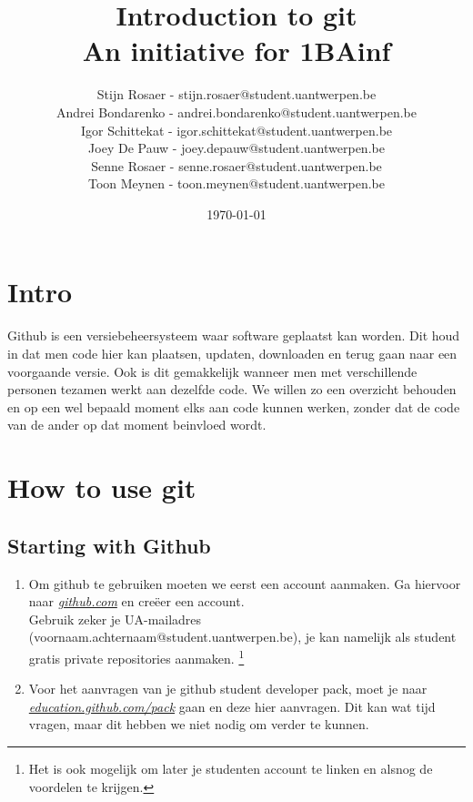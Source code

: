 \documentclass[a4paper, titlepage]{article}
\begin{document}
	\title{Introduction to git\\ \large An initiative for 1BAinf}
	\date{\today}

	\author{Stijn Rosaer - stijn.rosaer@student.uantwerpen.be\\
	Andrei Bondarenko - andrei.bondarenko@student.uantwerpen.be\\
		Igor Schittekat - igor.schittekat@student.uantwerpen.be\\
	Joey De Pauw - joey.depauw@student.uantwerpen.be\\
	Senne Rosaer - senne.rosaer@student.uantwerpen.be\\
	Toon Meynen - toon.meynen@student.uantwerpen.be
	}
	\maketitle
	
	\tableofcontents
	\section{Intro}
		Github is een versiebeheersysteem waar software geplaatst kan worden. Dit houd in dat men code hier kan plaatsen, updaten, downloaden en terug gaan naar een voorgaande versie. Ook is dit gemakkelijk wanneer men met verschillende personen tezamen werkt aan dezelfde code. We willen zo een overzicht behouden en op een wel bepaald moment elks aan code kunnen werken, zonder dat de code van de ander op dat moment beinvloed wordt.
	

	\pagebreak
	
	\section{How to use git}
		\subsection{Starting with Github}
			\begin{enumerate}
				\item Om github te gebruiken moeten we eerst een account aanmaken. Ga hiervoor naar \href{https://github.com/}{\textit{github.com}} en cre\"eer een account.\\	
				Gebruik zeker je UA-mailadres (voornaam.achternaam@student.uantwerpen.be), je kan namelijk als student gratis private repositories aanmaken. \footnote{Het is ook mogelijk om later je studenten account te linken en alsnog de voordelen te krijgen.}
				\item Voor het aanvragen van je github student developer pack, moet je naar  \href{https://education.github.com/pack}{\textit{education.github.com/pack}} gaan en deze hier aanvragen. Dit kan wat tijd vragen, maar dit hebben we niet nodig om verder te kunnen.
			\end{enumerate}
\end{document}
